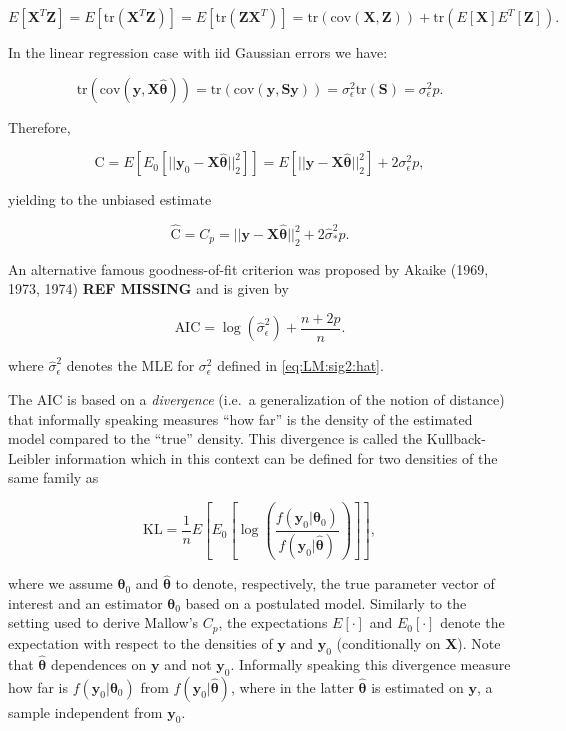 \documentclass[]{book}
\theoremstyle{definition}
\theoremstyle{definition}
\theoremstyle{definition}
\theoremstyle{remark}
\begin{document}
{\[E \left[\mathbf{X}^T \boldsymbol{Z}\right]  = E \left[\text{tr} \left(\mathbf{X}^T \boldsymbol{Z}\right)\right] = E \left[\text{tr} \left( \boldsymbol{Z} \mathbf{X}^T \right)\right] = \text{tr} \left(\text{cov} \left(\mathbf{X}, \boldsymbol{Z}\right)\right) + \text{tr} \left(E[\mathbf{X}] E^T[\boldsymbol{Z}]\right). \]

In the linear regression case with iid Gaussian errors we have:

\[\text{tr} \left( \text{cov} \left(\mathbf{y}, \mathbf{X} \hat{\boldsymbol{\theta}} \right)\right) = \text{tr} \left( \text{cov} \left(\mathbf{y}, \mathbf{S} \mathbf{y} \right)\right) = \sigma_{\epsilon}^2 \text{tr}\left(\mathbf{S}\right) = \sigma_{\epsilon}^2 p.\]

Therefore,

\[\text{C} = E \left[ E_0 \left[ || \mathbf{y}_0 - \mathbf{X}\hat{\boldsymbol{\theta}}||_2^2 \right] \right] = E \left[ || \mathbf{y} - \mathbf{X}\hat{\boldsymbol{\theta}}||_2^2 \right] + 2 \sigma_{\epsilon}^2 p, \]

yielding to the unbiased estimate

\[\widehat{\text{C}} = C_p = || \mathbf{y} - \mathbf{X}\hat{\boldsymbol{\theta}}||_2^2 +  2 \hat{\sigma}_{\ast}^2 p.\]

An alternative famous goodness-of-fit criterion was proposed by Akaike
(1969, 1973, 1974) \textbf{REF MISSING} and is given by

\begin{equation}\text{AIC} = \log \left(\hat{\sigma}^2_{\epsilon} \right) + \frac{n + 2p}{n}.
\label{eq:defAIC}
\end{equation}

where \(\hat{\sigma}^2_{\epsilon}\) denotes the MLE for
\(\sigma_{\epsilon}^2\) defined in \eqref{eq:LM:sig2:hat}.

The AIC is based on a \emph{divergence} (i.e.~a generalization of the
notion of distance) that informally speaking measures ``how far'' is the
density of the estimated model compared to the ``true'' density. This
divergence is called the Kullback-Leibler information which in this
context can be defined for two densities of the same family as

\[\text{KL}  =  \frac{1}{n} E \left[ E_0 \left[\log \left(  
\frac{f (\mathbf{y}_0| \boldsymbol{\theta}_0)}
{f (\mathbf{y}_0| \hat{\boldsymbol{\theta}})}
\right)\right] \right],\]

where we assume \(\boldsymbol{\theta}_0\) and
\(\hat{\boldsymbol{\theta}}\) to denote, respectively, the true
parameter vector of interest and an estimator \(\boldsymbol{\theta}_0\)
based on a postulated model. Similarly to the setting used to derive
Mallow's \(C_p\), the expectations \(E \left[\cdot\right]\) and
\(E_0 \left[\cdot\right]\) denote the expectation with respect to the
densities of \(\mathbf{y}\) and \(\mathbf{y}_0\) (conditionally on
\(\mathbf{X}\)). Note that \(\hat{\boldsymbol{\theta}}\) dependences on
\(\mathbf{y}\) and not \(\mathbf{y}_0\). Informally speaking this
divergence measure how far is
\(f (\mathbf{y}_0| \boldsymbol{\theta}_0)\) from
\(f (\mathbf{y}_0| \hat{\boldsymbol{\theta}})\), where in the latter
\(\hat{\boldsymbol{\theta}}\) is estimated on \(\mathbf{y}\), a sample
independent from \(\mathbf{y}_0\).

}
\end{document}
